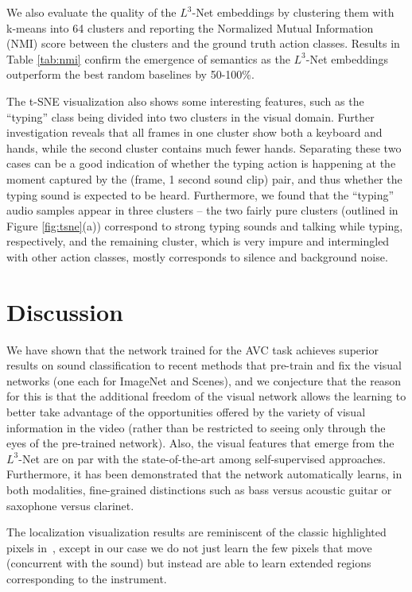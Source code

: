 \documentclass[10pt,twocolumn,letterpaper]{article}
\begin{document}
\tabNMI

We also evaluate the quality of the $L^3$-Net embeddings by clustering them
with k-means into 64 clusters and reporting the Normalized Mutual Information
(NMI) score between the clusters and the ground truth action classes.
Results in Table \ref{tab:nmi} confirm the emergence of semantics as
the $L^3$-Net embeddings outperform the best random baselines by 50-100\%.

The t-SNE visualization also shows some interesting features,
such as the ``typing'' class being divided into two clusters in the visual
domain. Further investigation reveals that all frames in one cluster
show both a keyboard and hands, while the second cluster contains
much fewer hands. Separating these two cases can be a good indication of
whether the typing action is happening at the moment captured by the
(frame, 1 second sound clip) pair, and thus whether the typing sound
is expected to be heard. Furthermore, we found that the ``typing''
audio samples appear in three clusters -- the two fairly pure clusters
(outlined in Figure \ref{fig:tsne}(a)) correspond to strong typing sounds
and talking while typing, respectively, and the remaining cluster,
which is very impure and intermingled with other action classes,
mostly corresponds to silence and background noise.

\figUnitsAmap
\figTsne


\section{Discussion}

We have shown that the network trained for the AVC task achieves
superior results on sound classification to recent methods
that pre-train and fix the visual networks (one each for ImageNet and Scenes),
and we conjecture that the reason for this is that the additional freedom
of the visual network allows the learning to better take advantage of the 
opportunities offered by the variety of visual information in the video
(rather than be restricted to seeing only through the eyes of the pre-trained
network).
Also, the visual features that emerge from the $L^3$-Net
are on par with the state-of-the-art among self-supervised approaches.
Furthermore,
it has been demonstrated that the network automatically learns,
in both modalities,
fine-grained distinctions such as bass versus acoustic guitar or
saxophone versus clarinet.

The localization visualization results are reminiscent of the classic
highlighted pixels in~\cite{Kidron05}, except in our case we do not just learn
the few pixels that move (concurrent with the sound) but instead are able
to learn extended regions corresponding to the instrument.
\end{document}
